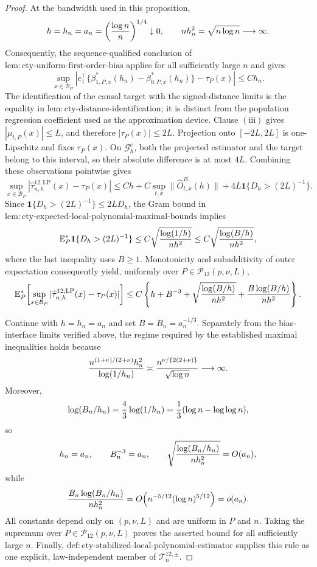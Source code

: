 \documentclass{article}
\begin{document}
\begin{proof}
At the bandwidth used in this proposition,
\[
 h=h_n=a_n=\left({\log n\over n}\right)^{1/4}\downarrow0,
 \qquad
 nh_n^2=\sqrt{n\log n}\longrightarrow\infty.
\]
Consequently, the sequence-qualified conclusion of \(\mathrm{lem:cty\text{-}uniform\text{-}first\text{-}order\text{-}bias}\) applies for all sufficiently large \(n\) and gives
\[
 \sup_{x\in\mathcal B_P}\left|
 e_1^\top\{\beta^*_{1,P,x}(h_n)-\beta^*_{0,P,x}(h_n)\}-\tau_P(x)
 \right|\leq Ch_n.
\]
The identification of the causal target with the signed-distance limits is the equality in \(\mathrm{lem:cty\text{-}distance\text{-}identification}\); it is distinct from the population regression coefficient used as the approximation device.  Clause \(\mathrm{(iii)}\) gives \(|\mu_{t,P}(x)|\leq L\), and therefore \(|\tau_P(x)|\leq2L\).  Projection onto \([-2L,2L]\) is one-Lipschitz and fixes \(\tau_P(x)\).  On \(\mathcal G_h^c\), both the projected estimator and the target belong to this interval, so their absolute difference is at most \(4L\).  Combining these observations pointwise gives
\[
 \sup_{x\in\mathcal B_P}
 |\widehat\tau^{12,\mathrm{LP}}_{n,h}(x)-\tau_P(x)|
 \leq Ch+C\sup_{t,x}\lVert\widehat O^B_{t,x}(h)\rVert
 +4L\mathbf1\{D_h>(2L)^{-1}\}.
\]
Since \(\mathbf1\{D_h>(2L)^{-1}\}\leq2LD_h\), the Gram bound in \(\mathrm{lem:cty\text{-}expected\text{-}local\text{-}polynomial\text{-}maximal\text{-}bounds}\) implies
\[
 \mathbb E_P^*\mathbf1\{D_h>(2L)^{-1}\}
 \leq C\sqrt{{\log(1/h)\over nh^2}}
 \leq C\sqrt{{\log(B/h)\over nh^2}},
\]
where the last inequality uses \(B\geq1\).  Monotonicity and subadditivity of outer expectation consequently yield, uniformly over \(P\in\mathcal P_{12}(p,\nu,L)\),
\[
 \mathbb E_P^*\!\left[
 \sup_{x\in\mathcal B_P}
 |\widehat\tau^{12,\mathrm{LP}}_{n,h}(x)-\tau_P(x)|
 \right]
 \leq C\left\{h+B^{-3}+\sqrt{{\log(B/h)\over nh^2}}
 +{B\log(B/h)\over nh^2}\right\}.
\]

Continue with \(h=h_n=a_n\) and set \(B=B_n=a_n^{-1/3}\).  Separately from the bias-interface limits verified above, the regime required by the established maximal inequalities holds because
\[
 {n^{(1+\nu)/(2+\nu)}h_n^2\over\log(1/h_n)}
 \asymp {n^{\nu/\{2(2+\nu)\}}\over\sqrt{\log n}}
 \longrightarrow\infty.
\]
Moreover,
\[
 \log(B_n/h_n)={4\over3}\log(1/h_n)
 ={1\over3}(\log n-\log\log n),
\]
so
\[
 h_n=a_n,\qquad B_n^{-3}=a_n,
 \qquad \sqrt{{\log(B_n/h_n)\over nh_n^2}}=O(a_n),
\]
while
\[
 {B_n\log(B_n/h_n)\over nh_n^2}
 =O\!\left(n^{-5/12}(\log n)^{5/12}\right)=o(a_n).
\]
All constants depend only on \((p,\nu,L)\) and are uniform in \(P\) and \(n\).  Taking the supremum over \(P\in\mathcal P_{12}(p,\nu,L)\) proves the asserted bound for all sufficiently large \(n\).  Finally, \(\mathrm{def:cty\text{-}stabilized\text{-}local\text{-}polynomial\text{-}estimator}\) supplies this rule as one explicit, law-independent member of \(\mathcal T_n^{12,\pm}\).
\end{proof}
\end{document}
